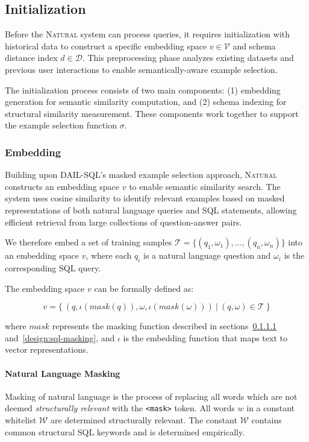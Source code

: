 \subsection{Initialization}

Before the \textsc{Natural} system can process queries, it requires initialization
with historical data to construct a specific embedding space $v \in \mathcal{V}$ and
schema distance index $d \in \mathcal{D}$. This preprocessing phase analyzes existing
datasets and previous user interactions to enable semantically-aware example selection.

The initialization process consists of two main components: (1) embedding generation
for semantic similarity computation, and (2) schema indexing for structural similarity
measurement. These components work together to support the example selection function $\sigma$.

\subsubsection{Embedding}\label{design:embedding}

Building upon DAIL-SQL's masked example selection approach, \textsc{Natural} constructs
an embedding space $v$ to enable semantic similarity search. The system uses cosine
similarity to identify relevant examples based on masked representations of both
natural language queries and SQL statements, allowing efficient retrieval from
large collections of question-answer pairs.

We therefore embed a set of training samples $\mathcal{T} = \{(q_1, \omega_1), ..., (q_n, \omega_n)\}$
into an embedding space $v$, where each $q_i$ is a natural language question and $\omega_i$
is the corresponding SQL query.

The embedding space $v$ can be formally defined as:

$$v = \{~(q, \iota(mask(q)), \omega, \iota(mask(\omega)))~|~(q, \omega) \in \mathcal{T}~\}$$

where $mask$ represents the masking function described in sections~\ref{design:nl-masking}
and~\ref{design:sql-masking}, and $\iota$ is the embedding function that maps text to vector representations.

\paragraph{Natural Language Masking}\label{design:nl-masking}

Masking of natural language is the process of replacing all words which are not
deemed \textit{structurally relevant} with the \texttt{<mask>} token. All words
$w$ in a constant whitelist $\mathcal{W}$ are determined structurally relevant.
The constant $\mathcal{W}$ contains common structural SQL keywords and is determined empirically.

